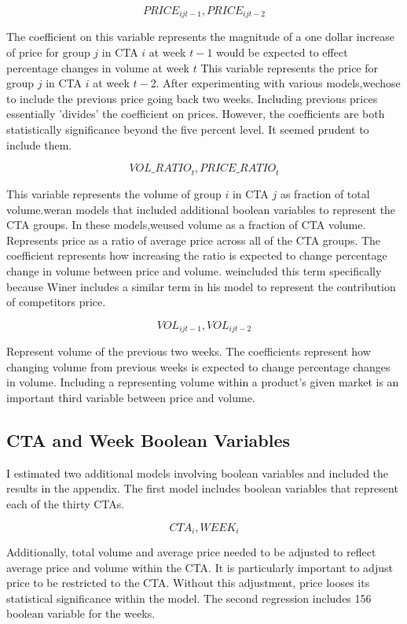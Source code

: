 \documentclass{article}
\begin{document}
$${PRICE}_{ijt-1}, {PRICE}_{ijt-2} $$

The coefficient on this variable represents the magnitude of a one dollar increase of price for group $j$ in CTA $i$ at week $t-1$ would be expected to effect percentage changes in volume at week $t$
This variable represents the price for group $j$ in CTA $i$ at week $t-2$. After experimenting with various models,wechose to include the previous price going back two weeks. Including previous prices essentially 'divides' the coefficient on prices. However, the coefficients are both statistically significance beyond the five percent level. It seemed prudent to include them.

$${VOL\_RATIO}_t, {PRICE\_RATIO}_{t} $$ 

This variable represents the volume of group $i$ in CTA $j$ as  fraction of total volume.weran models that included additional boolean variables to represent the CTA groups. In these models,weused volume as a fraction of CTA volume.
Represents price as a ratio of average price across all of the CTA groups. The coefficient represents how increasing the ratio is expected to change percentage change in volume between price and volume. weincluded this term specifically because Winer includes a similar term in his model to represent the contribution of competitors price.

$${VOL}_{ijt-1}, {VOL}_{ijt-2} $$

Represent volume of the previous two weeks. The coefficients represent how changing volume from previous weeks is expected to change percentage changes in volume. Including a representing volume within a product's given market is an important third variable between price and volume.

\subsection{CTA and Week Boolean Variables}

I estimated two additional models involving boolean variables and included the results in the appendix. The first model includes boolean variables that represent each of the thirty CTAs.

$$ CTA_i, WEEK_{i}$$

Additionally, total volume and average price needed to be adjusted to reflect average price and volume within the CTA. It is particularly important to adjust price to be restricted to the CTA. Without this adjustment, price looses its statistical significance within the model. The second regression includes 156 boolean variable for the weeks.
\end{document}
